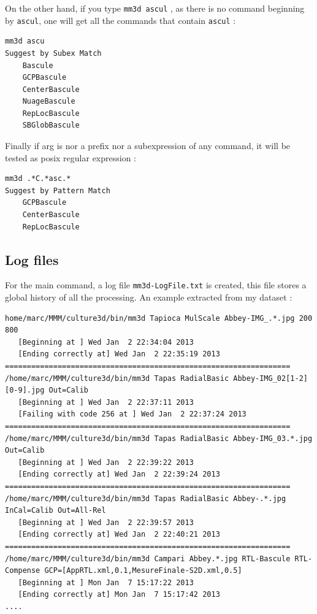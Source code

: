On the other hand, if you type {\tt mm3d ascul} , as there is no command beginning by {\tt ascul},
one will get all the commands that contain {\tt ascul} :


\begin{verbatim}
mm3d ascu
Suggest by Subex Match
    Bascule
    GCPBascule
    CenterBascule
    NuageBascule
    RepLocBascule
    SBGlobBascule
\end{verbatim}


Finally if arg is nor a prefix nor a subexpression of any command, it will be tested as posix regular
expression :

\begin{verbatim}
mm3d .*C.*asc.*
Suggest by Pattern Match
    GCPBascule
    CenterBascule
    RepLocBascule
\end{verbatim}

\subsection{Log files}

For the main command, a log file {\tt mm3d-LogFile.txt} is created, this file stores
a global history of all the processing. An example extracted from my dataset :

\begin{verbatim}
home/marc/MMM/culture3d/bin/mm3d Tapioca MulScale Abbey-IMG_.*.jpg 200 800
   [Beginning at ] Wed Jan  2 22:34:04 2013
   [Ending correctly at] Wed Jan  2 22:35:19 2013
=================================================================
/home/marc/MMM/culture3d/bin/mm3d Tapas RadialBasic Abbey-IMG_02[1-2][0-9].jpg Out=Calib
   [Beginning at ] Wed Jan  2 22:37:11 2013
   [Failing with code 256 at ] Wed Jan  2 22:37:24 2013
=================================================================
/home/marc/MMM/culture3d/bin/mm3d Tapas RadialBasic Abbey-IMG_03.*.jpg Out=Calib
   [Beginning at ] Wed Jan  2 22:39:22 2013
   [Ending correctly at] Wed Jan  2 22:39:24 2013
=================================================================
/home/marc/MMM/culture3d/bin/mm3d Tapas RadialBasic Abbey-.*.jpg InCal=Calib Out=All-Rel
   [Beginning at ] Wed Jan  2 22:39:57 2013
   [Ending correctly at] Wed Jan  2 22:40:21 2013
=================================================================
/home/marc/MMM/culture3d/bin/mm3d Campari Abbey.*.jpg RTL-Bascule RTL-Compense GCP=[AppRTL.xml,0.1,MesureFinale-S2D.xml,0.5]
   [Beginning at ] Mon Jan  7 15:17:22 2013
   [Ending correctly at] Mon Jan  7 15:17:42 2013
....
\end{verbatim}


